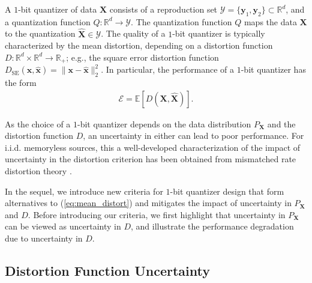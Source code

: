 \documentclass[conference]{IEEEtran}
\begin{document}
A $1$-bit quantizer of data $\mathbf{X}$ consists of a reproduction set $\mathcal{Y} = \{\mathbf{y}_1,\mathbf{y}_2\} \subset \mathbb{R}^d$, and a quantization function $Q: \mathbb{R}^d \rightarrow \mathcal{Y}$. The quantization function $Q$ maps the data $\mathbf{X}$ to the quantization $\hat{\mathbf{X}} \in \mathcal{Y}$. The quality of a $1$-bit quantizer is typically characterized by the mean distortion, depending on a distortion function $D: \mathbb{R}^d \times \mathbb{R}^d \rightarrow \mathbb{R}_+$; e.g., the square error distortion function $D_{\mathrm{SE}}(\mathbf{x},\hat{\mathbf{x}}) = \|\mathbf{x} - \hat{\mathbf{x}}\|_2^2$. In particular, the performance of a $1$-bit quantizer has the form 
\begin{align}\label{eq:mean_distort}
	\mathcal{E} = \mathbb{E}[D(\mathbf{X},\hat{\mathbf{X}})].
\end{align}

As the choice of a $1$-bit quantizer depends on the data distribution $P_{\mathbf{X}}$ and the distortion function $D$, an uncertainty in either can lead to poor performance. For i.i.d. memoryless sources, this a well-developed characterization of the impact of uncertainty in the distortion criterion has been obtained from mismatched rate distortion theory \cite{Kanabar2024mismatched}. 

In the sequel, we introduce new criteria for $1$-bit quantizer design that form alternatives to (\ref{eq:mean_distort}) and mitigates the impact of uncertainty in $P_{\mathbf{X}}$ and $D$. Before introducing our criteria, we first highlight that uncertainty in $P_{\mathbf{X}}$ can be viewed as uncertainty in $D$, and illustrate the performance degradation due to uncertainty in $D$.   

\subsection{Distortion Function Uncertainty}\label{sec:p_X_uncertainty}
\end{document}
